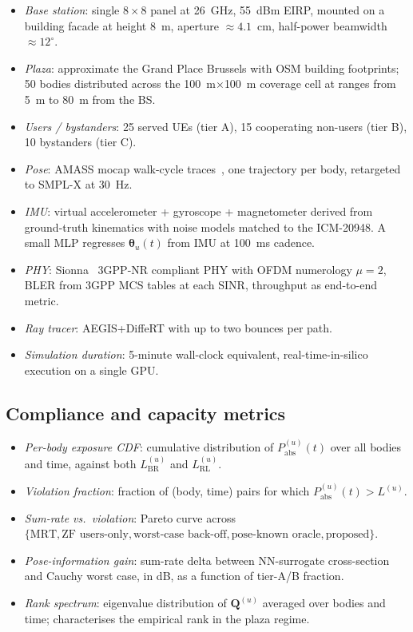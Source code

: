 \documentclass[journal,twoside,onecolumn]{IEEEtran}
\theoremstyle{definition}
\newcommand{\Pabs}{P_{\mathrm{abs}}}
\newcommand{\Q}{\mathbf{Q}}
\begin{document}
\begin{itemize}
\item
\emph{Base station}: single $8{\times}8$ panel at 26~GHz, 55~dBm
EIRP, mounted on a building facade at height \SI{8}{m}, aperture
$\approx 4.1$~cm, half-power beamwidth $\approx 12^{\circ}$.
\item
\emph{Plaza}: approximate the Grand Place Brussels with OSM
building footprints; \num{50} bodies distributed across the
\SI{100}{m}$\times$\SI{100}{m} coverage cell at ranges from
\SI{5}{m} to \SI{80}{m} from the BS.
\item
\emph{Users / bystanders}: \num{25} served UEs (tier A), \num{15}
cooperating non-users (tier B), \num{10} bystanders (tier C).
\item
\emph{Pose}: AMASS mocap walk-cycle traces~\cite{AMASS}, one
trajectory per body, retargeted to SMPL-X at \SI{30}{Hz}.
\item
\emph{IMU}: virtual accelerometer + gyroscope + magnetometer
derived from ground-truth kinematics with noise models matched to
the ICM-20948. A small MLP regresses $\bm\theta_u(t)$ from IMU at
\SI{100}{ms} cadence.
\item
\emph{PHY}: Sionna~\cite{Sionna} 3GPP-NR compliant PHY with OFDM
numerology $\mu=2$, BLER from 3GPP MCS tables at each SINR,
throughput as end-to-end metric.
\item
\emph{Ray tracer}: AEGIS+DiffeRT with up to two bounces per path.
\item
\emph{Simulation duration}: 5-minute wall-clock equivalent,
real-time-in-silico execution on a single GPU.
\end{itemize}

\subsection{Compliance and capacity metrics}

\begin{itemize}
\item
\emph{Per-body exposure CDF}: cumulative distribution of
$\Pabs^{(u)}(t)$ over all bodies and time, against both $L^{(u)}_{\mathrm{BR}}$ and $L^{(u)}_{\mathrm{RL}}$.
\item
\emph{Violation fraction}: fraction of (body, time) pairs for which
$\Pabs^{(u)}(t)>L^{(u)}$.
\item
\emph{Sum-rate vs.\ violation}: Pareto curve across
$\{\text{MRT},\text{ZF users-only},\text{worst-case back-off},\text{pose-known oracle},\text{proposed}\}$.
\item
\emph{Pose-information gain}: sum-rate delta between NN-surrogate
cross-section and Cauchy worst case, in dB, as a function of
tier-A/B fraction.
\item
\emph{Rank spectrum}: eigenvalue distribution of $\Q^{(u)}$
averaged over bodies and time; characterises the empirical rank in
the plaza regime.
\end{itemize}
\end{document}
